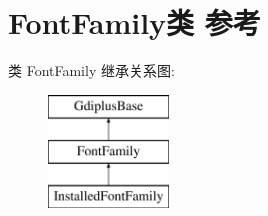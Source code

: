 \hypertarget{class_font_family}{}\section{Font\+Family类 参考}
\label{class_font_family}
类 Font\+Family 继承关系图\+:\begin{figure}[H]
\begin{center}
\leavevmode
\includegraphics[height=3.000000cm]{class_font_family}
\end{center}
\end{figure}
